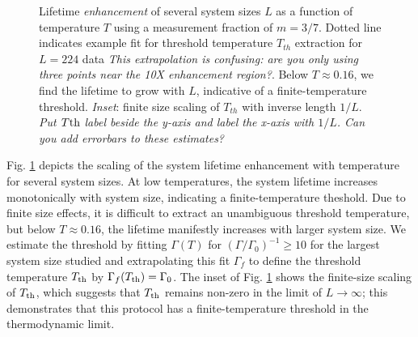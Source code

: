 \documentclass[twocolumn,superscriptaddress,aps,prb,floatfix]{revtex4-1}
\newcommand{\figref}[1]{Fig. \ref{#1}}
\newcommand{\CMH}[1]{{\color{green} { #1}}}
\begin{document}
\begin{figure}
\begin{center}
\end{center}
\caption{Lifetime {\it enhancement} of several system sizes $L$ as a function of temperature $T$ using a measurement fraction of $m=3/7$.  Dotted line indicates example fit for threshold temperature $T_{th}$ extraction for $L=224$ data \CMH{\it{This extrapolation is confusing: are you only using three points near the 10X enhancement region?}}.  Below $T\approx0.16$, we find the lifetime to grow with $L$, indicative of a finite-temperature threshold. {\it Inset}: finite size scaling of $T_{th}$ with inverse length $1/L$. \CMH{\it{Put $T{\rm{th}}$ label beside the y-axis and label the x-axis with $1/L$. Can you add errorbars to these estimates?}}}
\label{fig:LifetimeVsTemperature}
\end{figure}

\figref{fig:LifetimeVsTemperature} depicts the scaling of the system lifetime enhancement with temperature for several system sizes.  At low temperatures, the system lifetime increases monotonically with system size, indicating a finite-temperature theshold.  Due to finite size effects, it is difficult to extract an unambiguous threshold temperature, but below $T\approx0.16$, the lifetime manifestly increases with larger system size.  We estimate the threshold by fitting $\Gamma(T)$ for $(\Gamma/\Gamma_0)^{-1} \geq 10$ for the largest system size studied and extrapolating this fit $\Gamma_f$ to define the threshold temperature $T_{\rm{th}}$ by $\Gamma_f(T_{\rm{th}}) = \Gamma_0$. \CMH{ The inset of \figref{fig:LifetimeVsTemperature} shows the finite-size scaling of $T_{\rm{th}}$, which suggests that $T_{\rm{th}}$ remains non-zero in the limit of $L\rightarrow \infty$; this demonstrates that this protocol has a finite-temperature threshold in the thermodynamic limit.}
\end{document}
